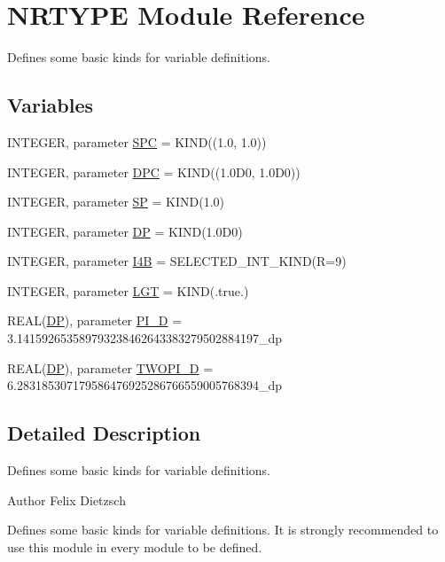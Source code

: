 \hypertarget{namespaceNRTYPE}{
\section{NRTYPE Module Reference}
\label{namespaceNRTYPE}
}


Defines some basic kinds for variable definitions.  


\subsection*{Variables}
\begin{DoxyCompactItemize}
\item 
INTEGER, parameter \hyperlink{namespaceNRTYPE_a203d15b0d754eb809bb2d9689c0f4a20}{SPC} = KIND((1.0, 1.0))
\item 
INTEGER, parameter \hyperlink{namespaceNRTYPE_aef0a8a355687c7f4bb0cfc4da1fa7dc1}{DPC} = KIND((1.0D0, 1.0D0))
\item 
INTEGER, parameter \hyperlink{namespaceNRTYPE_a0e27dcc6c8b8c3b676b0ebdeda77f849}{SP} = KIND(1.0)
\item 
INTEGER, parameter \hyperlink{namespaceNRTYPE_ac04234d0d9fbb992bc90e09d33317d5a}{DP} = KIND(1.0D0)
\item 
INTEGER, parameter \hyperlink{namespaceNRTYPE_a58a56fb59c61ae4e8af28eabfe3d3b59}{I4B} = SELECTED\_\-INT\_\-KIND(R=9)
\item 
INTEGER, parameter \hyperlink{namespaceNRTYPE_ac467681e919a8be9d83a8bf1808d497c}{LGT} = KIND(.true.)
\item 
REAL(\hyperlink{namespaceNRTYPE_ac04234d0d9fbb992bc90e09d33317d5a}{DP}), parameter \hyperlink{namespaceNRTYPE_a651a3a781cff22a0a0886657381949db}{PI\_\-D} = 3.141592653589793238462643383279502884197\_\-dp
\item 
REAL(\hyperlink{namespaceNRTYPE_ac04234d0d9fbb992bc90e09d33317d5a}{DP}), parameter \hyperlink{namespaceNRTYPE_a39b7abf71e8b2487187ea1b1f3a2dedf}{TWOPI\_\-D} = 6.283185307179586476925286766559005768394\_\-dp
\end{DoxyCompactItemize}


\subsection{Detailed Description}
Defines some basic kinds for variable definitions. \begin{DoxyAuthor}{Author}
Felix Dietzsch
\end{DoxyAuthor}
Defines some basic kinds for variable definitions. It is strongly recommended to use this module in every module to be defined. 

